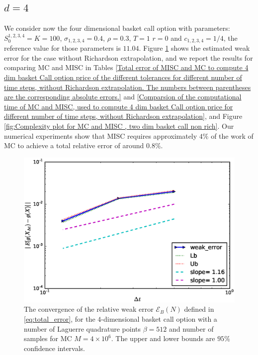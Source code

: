 \subsection{$d=4$}
We consider now  the four dimensional basket call option  with parameters:  $S_0^{1,2,3,4}=K=100$, $\sigma_{1,2,3,4}=0.4$, $\rho=0.3$, $T=1$ $r=0$ and $c_{1,2,3,4}=1/4$, the reference value for those parameters  is  $11.04$. Figure \ref{fig:Weak_rate_4_dim_basket} shows the estimated   weak error  for the case without Richardson extrapolation, and we report the results for comparing MC and MISC in Tables \ref{Total error of MISC and MC to compute 4 dim basket  Call option price of the different tolerances for different number of time steps, without Richardson extrapolation. The numbers between parentheses are the corresponding absolute errors.} and \ref{Comparsion of the computational time of  MC and MISC, used to compute 4 dim basket Call option price  for different number of time steps, without Richardson extrapolation}, and Figure \ref{fig:Complexity plot for MC and MISC , two dim basket call non rich}.  Our numerical experiments show that MISC  requires approximately $4\%$ of the work of MC  to achieve a total relative error of around $0.8\%$.

\FloatBarrier
\begin{figure}[h!]
		\centering
		\includegraphics[width=0.4\linewidth]{./figures/basket_call_4d_time_stepping/weak_convergence/weak_convergence_order_basket_option_4d_relative_M_4_10_6_beta_256}

	\caption{The convergence of the relative weak error  $\mathcal{E}_B(N)$ defined in \ref{eq:total_error}, for the $4$-dimensional basket call option with  a number of Laguerre  quadrature points  $\beta=512$ and number of samples for MC $M=4 \times 10^6$. The upper and lower bounds are $95\%$ confidence intervals.}
	\label{fig:Weak_rate_4_dim_basket}
\end{figure}
\FloatBarrier

